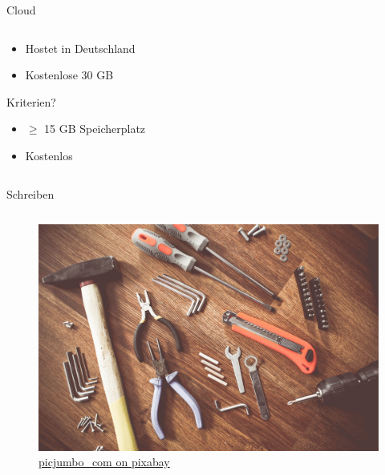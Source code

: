 \documentclass[aspectratio=169,shownotes]{beamer}
\begin{document}
\begin{frame}[t]{Cloud}
\begin{columns}[t]
\begin{column}{0.7\textwidth}
\begin{itemize}[]
\begin{itemize}
                    \item Hostet in Deutschland
                    \item Kostenlose 30 GB
                \end{itemize}
            \end{itemize}
            Kriterien?
            \begin{itemize}[]
                \item $\geq$ 15 GB Speicherplatz
                \item Kostenlos
            \end{itemize}
        \end{column}        
    \end{columns}
\end{frame}

\begin{frame}[t]{Schreiben}
    \begin{columns}[t]
        \begin{column}{0.29\textwidth}      
            \vspace{-3em} 
            \begin{figure}[t]
                \begin{flushleft}
                    \includegraphics[height=0.8\textheight,trim={0 0 25cm 0},clip]{graphics/tools-864983_1280.jpg}         
                    \caption*{\href{https://pixabay.com/de/photos/werkzeuge-konstruieren-boot-864983/}{picjumbo\_com on pixabay}}    
                \end{flushleft}                
                      

\end{figure}
\end{column}
\end{columns}
\end{frame}
\end{document}
